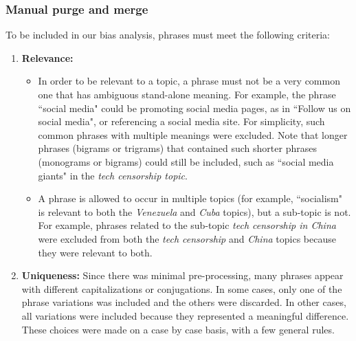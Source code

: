 \documentclass[10pt,letterpaper]{article}
\begin{document}
\subsubsection*{Manual purge and merge}

To be included in our bias analysis, phrases must meet the following criteria:
\begin{enumerate}
\item {\bf Relevance:}
\begin{itemize}
\item In order to be relevant to a topic, a phrase
must not be a very common one that has ambiguous stand-alone meaning.  For example, the phrase ``social media" could be promoting social media pages, as in ``Follow us on social media", or referencing a social media site. For simplicity, such common phrases with multiple meanings were excluded. Note that longer phrases (bigrams or trigrams) that contained such shorter phrases (monograms or bigrams) could still be included, such as ``social media giants" in the \textit{tech censorship topic}.
\item A phrase is allowed to occur in multiple topics (for example, ``socialism" is relevant to both the \textit{Venezuela} and \textit{Cuba} topics), but a sub-topic is not.
For example, phrases related to the sub-topic {\it tech censorship in China} were excluded from both the \textit{tech censorship} and \textit{China} topics because they were relevant to both.  
\end{itemize}
\item {\bf Uniqueness:}
Since there was minimal pre-processing, many phrases appear with different capitalizations or conjugations. In some cases, only one of the phrase variations was included and the others were discarded. In other cases, all variations were included because they represented a meaningful difference. These choices were made on a case by case basis, with a few general rules. 


\end{enumerate}
\end{document}
